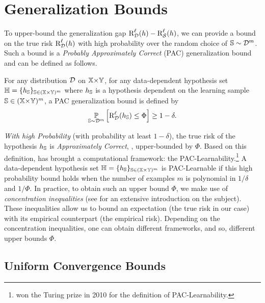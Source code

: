 \section{Generalization Bounds}
\label{chap:intro:sec:bound}
 
To upper-bound the generalization gap $\text{R}^{\ell}_{\mathcal{D}}(h)-\text{R}^{\ell}_{\mathcal{S}}(h)$, we can provide a bound on the true risk $\text{R}^{\ell}_{\mathcal{D}}(h)$ with high probability over the random choice of $\mathbb{S}\sim\mathcal{D}^m$.
Such a bound is a {\it Probably Approximately Correct} (PAC) generalization bound~\citep{Valiant1984} and can be defined as follows.

\begin{definition} For any distribution $\mathcal{D}$ on $\mathbb{X}{\times}\mathbb{Y}$, for any data-dependent hypothesis set $\mathbb{H}=\{h_{\mathbb{S}}\}_{\mathbb{S}\in(\mathbb{X}{\times}\mathbb{Y})^m}$ where $h_{\mathbb{S}}$ is a hypothesis dependent on the learning sample $\mathbb{S}\in(\mathbb{X}{\times}\mathbb{Y})^m$, a PAC generalization bound is defined by
\begin{align*}
    \operatorname*{\mathbb{P}}_{\mathbb{S}\sim\mathcal{D}^m}\Big[ \text{R}^{\ell}_{\mathcal{D}}(h_{\mathbb{S}}) \le \Phi \Big]\ge 1-\delta.
\end{align*}
\label{chap:intro:def:pac}
\end{definition}

{\it With high Probability} (with probability at least $1{-}\delta$), the true risk of the hypothesis $h_{\mathbb{S}}$ is {\it Approximately Correct}, \ie, upper-bounded by $\Phi$.
Based on this definition, \citet{Valiant1984} has brought a computational framework: the PAC-Learnability.\footnote{\citeauthor{Valiant1984} won the Turing prize in 2010 for the definition of PAC-Learnability.}
A data-dependent hypothesis set $\mathbb{H}=\{h_{\mathbb{S}}\}_{\mathbb{S}\in(\mathbb{X}{\times\mathbb{Y}})^m}$ is PAC-Learnable if this high probability bound holds when the number of examples $m$ is polynomial in $1/\delta$ and $1/\Phi$.
In practice, to obtain such an upper bound $\Phi$, we make use of {\it concentration inequalities} (see \citet{BoucheronLugosiMassart2013} for an extensive introduction on the subject).
These inequalities allow us to bound an expectation (the true risk in our case) with its empirical counterpart (the empirical risk).
Depending on the concentration inequalities, one can obtain different frameworks, and so, different upper bounds $\Phi$.

\subsection{Uniform Convergence Bounds}
\label{chap:intro:sec:bound-uc}

